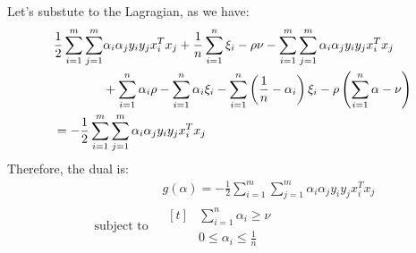 \begin{remark}
    Let's substute to the Lagragian, as we have:
    \begin{equation*}
    \begin{aligned}
    &\begin{aligned}[t]
        \frac{1}{2}\sum^m_{i=1}\sum^m_{j=1}&\alpha_i\alpha_jy_iy_jx_i^Tx_j + \frac{1}{n}\sum^n_{i=1}\xi_i - \rho\nu - \sum^m_{i=1}\sum^m_{j=1}\alpha_i\alpha_jy_iy_jx_i^Tx_j \\
        &+\sum^n_{i=1}\alpha_i\rho - \sum^n_{i=1}\alpha_i\xi_i - \sum^n_{i=1}\left( \frac{1}{n}-\alpha_i \right)\xi_i - \rho\left( \sum^n_{i=1}\alpha-\nu \right) 
    \end{aligned} \\
    &=-\frac{1}{2}\sum^m_{i=1}\sum^m_{j=1}\alpha_i\alpha_jy_iy_jx^T_ix_j
    \end{aligned}
    \end{equation*}
    Therefore, the dual is:
    \begin{equation*}
    \begin{aligned}
        &g(\alpha) = -\frac{1}{2}\sum^m_{i=1}\sum^m_{j=1}\alpha_i\alpha_jy_iy_jx_i^Tx_j \\ 
        \text{ subject to }&\begin{aligned}[t] 
            &\sum^n_{i=1}\alpha_i\ge\nu \\
            &0\le\alpha_i\le\frac{1}{n}
        \end{aligned}    
    \end{aligned}
    \end{equation*}
\end{remark}



